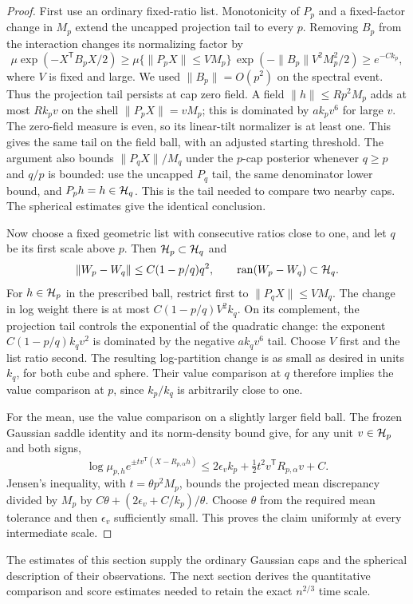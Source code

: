 \begin{proof}
First use an ordinary fixed-ratio list.  Monotonicity of $P_p$ and a
fixed-factor change in $M_p$ extend the uncapped projection tail to every
$p$.  Removing $B_p$ from the interaction changes its normalizing factor
by
\[
 \mu\exp(-X^{\mathsf T}B_pX/2)\ge
 \mu\{\|P_pX\|\le VM_p\}\,
       \exp(-\|B_p\|V^2M_p^2/2)\ge e^{-Ck_p},
\]
where $V$ is fixed and large.  We used $\|B_p\|=O(p^2)$ on the spectral
event.  Thus the projection tail persists at cap zero field.  A field
$\|h\|\le Rp^2M_p$ adds at most $Rk_pv$ on the shell
$\|P_pX\|=vM_p$; this is dominated by $ak_pv^6$ for large $v$.
The zero-field measure is even, so its linear-tilt normalizer is at least
one.  This gives the same tail on the field ball, with an adjusted
starting threshold.  The argument also bounds $\|P_qX\|/M_q$ under the
$p$-cap posterior whenever $q\ge p$ and $q/p$ is bounded: use the uncapped
$P_q$ tail, the same denominator lower bound, and $P_ph=h\in\mathcal H_q$.
This is the tail needed to compare two nearby caps.  The spherical estimates give the identical conclusion.

Now choose a fixed geometric list with consecutive ratios close to one,
and let $q$ be its first scale above $p$.  Then $\mathcal H_p\subset\mathcal H_q$ and
\[
 \|W_p-W_q\|\le C(1-p/q)q^2,
 \qquad \operatorname{ran}(W_p-W_q)\subset\mathcal H_q.
\]
For $h\in\mathcal H_p$ in the prescribed ball, restrict first to
$\|P_qX\|\le VM_q$.  The change in log weight there is at most
$C(1-p/q)V^2k_q$.  On its complement, the projection tail controls the
exponential of the quadratic change: the exponent
$C(1-p/q)k_qv^2$ is dominated by the negative $ak_qv^6$ tail.
Choose $V$ first and the list ratio second.  The resulting log-partition
change is as small as desired in units $k_q$, for both cube and sphere.
Their value comparison at $q$ therefore implies the value comparison at
$p$, since $k_p/k_q$ is arbitrarily close to one.

For the mean, use the value comparison on a slightly larger field ball.
The frozen Gaussian saddle identity and its norm-density bound give, for
any unit $v\in\mathcal H_p$ and both signs,
\[
 \log\mu_{p,h}e^{\pm t v^{\mathsf T}(X-R_{p,\alpha}h)}
       \le 2\epsilon_v k_p+\tfrac12t^2v^{\mathsf T}R_{p,\alpha}v+C.
\]
Jensen's inequality, with $t=\theta p^2M_p$, bounds the projected mean
discrepancy divided by $M_p$ by
$C\theta+(2\epsilon_v+C/k_p)/\theta$.  Choose $\theta$ from the required
mean tolerance and then $\epsilon_v$ sufficiently small.  This proves the
claim uniformly at every intermediate scale.
\end{proof}

The estimates of this section supply the ordinary Gaussian caps and the
spherical description of their observations.  The next section derives the
quantitative comparison and score estimates needed to retain the exact
$n^{2/3}$ time scale.
